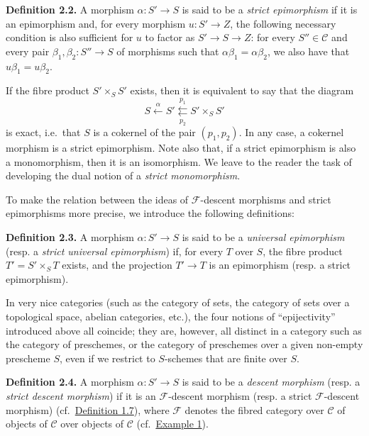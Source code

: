 \documentclass{article}
\newenvironment{rmenv}[1]
  {\phantomsection\par\smallskip\noindent\textbf{#1.}\rmfamily}
  {\par\smallskip}
\newcommand{\oldpage}[1]{\marginpar{\footnotesize$\Big\vert$ \textit{p.~#1}}}
\theoremstyle{definition}
\theoremstyle{definition}
\theoremstyle{definition}
\theoremstyle{definition}
\theoremstyle{remark}
\begin{document}
\leavevmode{}%
\begin{rmenv}{Definition 2.2}
A morphism \(\alpha\colon S'\to S\) is said to be a \emph{strict epimorphism} if it is an epimorphism and, for every morphism \(u\colon S'\to Z\), the following necessary condition is also sufficient for \(u\) to factor as \(S'\to S\to Z\):
for every \(S''\in{\mathcal{C}}\) and every pair \(\beta_1,\beta_2\colon S''\to S\) of morphisms such that \(\alpha\beta_1=\alpha\beta_2\), we also have that \(u\beta_1=u\beta_2\).

\end{rmenv}

If the fibre product \(S'\times_S S'\) exists, then it is equivalent to say that the diagram
\[
  S \xleftarrow{\alpha}
  S' \overset{p_1}{\underset{p_2}{\leftleftarrows}}
  S'\times_S S'
\]
\oldpage{190-07}is exact, i.e.~that \(S\) is a cokernel of the pair \((p_1,p_2)\).
In any case, a cokernel morphism is a strict epimorphism.
Note also that, if a strict epimorphism is also a monomorphism, then it is an isomorphism.
We leave to the reader the task of developing the dual notion of a \emph{strict monomorphism}.

To make the relation between the ideas of \({\mathcal{F}}\)-descent morphisms and strict epimorphisms more precise, we introduce the following definitions:

\leavevmode{}%
\begin{rmenv}{Definition 2.3}
A morphism \(\alpha\colon S'\to S\) is said to be a \emph{universal epimorphism} (resp. a \emph{strict universal epimorphism}) if, for every \(T\) over \(S\), the fibre product \(T'=S'\times_S T\) exists, and the projection \(T'\to T\) is an epimorphism (resp. a strict epimorphism).

\end{rmenv}

In very nice categories (such as the category of sets, the category of sets over a topological space, abelian categories, etc.), the four notions of ``epijectivity'' introduced above all coincide;
they are, however, all distinct in a category such as the category of preschemes, or the category of preschemes over a given non-empty prescheme \(S\), even if we restrict to \(S\)-schemes that are finite over \(S\).

\leavevmode{}%
\begin{rmenv}{Definition 2.4}
A morphism \(\alpha\colon S'\to S\) is said to be a \emph{descent morphism} (resp. a \emph{strict descent morphism}) if it is an \({\mathcal{F}}\)-descent morphism (resp. a strict \({\mathcal{F}}\)-descent morphism) (cf.~\protect\hyperlink{fga-3-i-section-A.1-definition-1.7}{Definition 1.7}), where \({\mathcal{F}}\) denotes the fibred category over \({\mathcal{C}}\) of objects of \({\mathcal{C}}\) over objects of \({\mathcal{C}}\) (cf.~\protect\hyperlink{fga-3-i-section-A.1-example-1}{Example 1}).

\end{rmenv}
\end{document}
